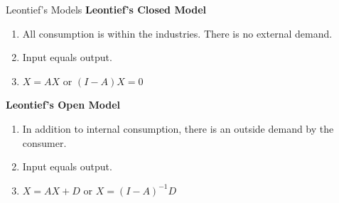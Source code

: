 \begin{summarybox}{Leontief's Models}
    \textbf{Leontief's Closed Model}
    \begin{enumerate}
        \item All consumption is within the industries. There is no external demand.
        \item Input equals output.
        \item $X = AX$ or $(I - A)X = 0$
    \end{enumerate}

    \textbf{Leontief's Open Model}
    \begin{enumerate}
        \item In addition to internal consumption, there is an outside demand by the consumer.
        \item Input equals output.
        \item $X = AX + D$ or $X = (I - A)^{-1} D$
    \end{enumerate}
\end{summarybox}
